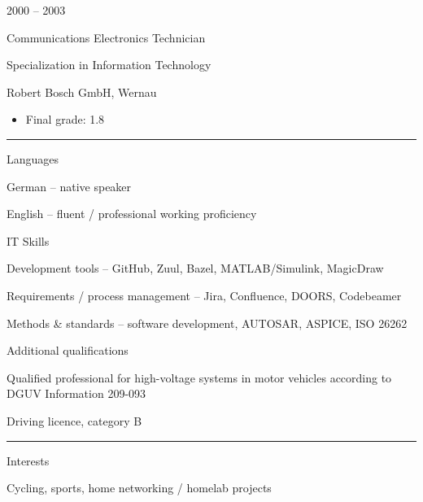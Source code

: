 \documentclass[a4paper,10pt]{article}
\newlength{\cvcolumngapwidth}
\newlength{\cvleftcolumnwidth}
\newlength{\cvrightcolumnwidth}
\newcommand{\cvsectionstyle}[1]{{\normalsize\cvsectionfont\textcolor{cvsectioncolor}{#1}}}
\newcommand{\cvtitlestyle}[1]{{\large\cvtitlefont\textcolor{cvtitlecolor}{#1}}}
\newcommand{\cvdurationstyle}[1]{{\small\cvdurationfont\textcolor{cvdurationcolor}{#1}}}
\newcommand{\cvheadingstyle}[1]{{\normalsize\cvheadingfont\textcolor{cvheadingcolor}{#1}}}
\newlength{\cvafteritemskipamount}
\newlength{\cvaftersectionskipamount}
\newlength{\cvbetweensectionandheadingextraskipamount}
\newlength{\cvaftertitleskipamount}
\newlength{\cvparskip}
\newcommand{\cvsection}[1]{
    \begin{minipage}[t]{\cvleftcolumnwidth}
        \raggedleft\cvsectionstyle{#1}
    \end{minipage}%
    \hspace{\cvcolumngapwidth}%
    \begin{minipage}[t]{\cvrightcolumnwidth}
        \textcolor{cvrulecolor}{\rule{\cvrightcolumnwidth}{0.3mm}}
    \end{minipage}
    \vspace{\cvaftersectionskipamount}
}
\newcommand{\cvitem}[2]{
    \begin{minipage}[t]{\cvleftcolumnwidth}
        \raggedleft #1
    \end{minipage}%
    \hspace{\cvcolumngapwidth}%
    \begin{minipage}[t]{\cvrightcolumnwidth}
        \setlength{\parskip}{\cvparskip} #2
    \end{minipage}
    \vspace{\cvafteritemskipamount}
}
\newcommand{\cvtitle}[1]{
    \cvtitlestyle{#1}
    \vspace{\cvaftertitleskipamount}
    \vspace{-\cvparskip}
}
\begin{document}
\cvitem{
    \cvdurationstyle{2000 -- 2003}
}{
    \cvtitle{Communications Electronics Technician}

    Specialization in Information Technology

    Robert Bosch GmbH, Wernau

    \begin{itemize}[leftmargin=*]
        \item Final grade: 1.8
    \end{itemize}
}

\cvsection{SKILLS}

\vspace{\cvbetweensectionandheadingextraskipamount}

\cvitem{
    \cvheadingstyle{Languages}
}{
    German -- native speaker

    English -- fluent / professional working proficiency
}

\cvitem{
    \cvheadingstyle{IT Skills}
}{
    Development tools -- GitHub, Zuul, Bazel, MATLAB/Simulink, MagicDraw

    Requirements / process management -- Jira, Confluence, DOORS, Codebeamer

    Methods \& standards -- software development, AUTOSAR, ASPICE, ISO 26262
}

\cvitem{
    \cvheadingstyle{Additional qualifications}
}{
    Qualified professional for high-voltage systems in motor vehicles according to DGUV Information 209-093

    Driving licence, category B
}

\cvsection{ADDITIONAL INFORMATION}

\vspace{\cvbetweensectionandheadingextraskipamount}

\cvitem{
    \cvheadingstyle{Interests}
}{
    Cycling, sports, home networking / homelab projects
}
\end{document}
